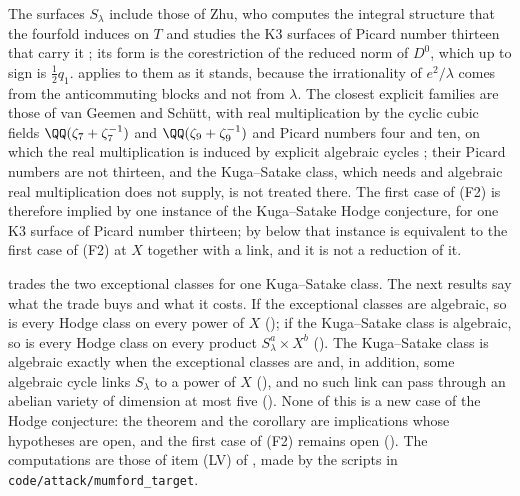 \begin{remark}
The surfaces $S_{\lambda}$ include those of Zhu, who computes the integral
structure that the fourfold induces on $T$ and studies the K3 surfaces of
Picard number thirteen that carry it \cite{Zhu18}; its form is the
corestriction of the reduced norm of $D^{0}$, which up to sign is
$\frac12q_{1}$.
 applies to them as it stands, because the irrationality
of $e^{2}/\lambda$ comes from the anticommuting blocks and not from $\lambda$.
The closest explicit families are those of van Geemen and Sch\"utt, with
real multiplication by the cyclic cubic fields $\QQ(\zeta_{7}+\zeta_{7}^{-1})$
and $\QQ(\zeta_{9}+\zeta_{9}^{-1})$ and Picard numbers four and ten, on which
the real multiplication is induced by explicit algebraic cycles
\cite[Theorem~1.2 and Section~4.8]{vGS25}; their Picard numbers are not
thirteen, and the Kuga--Satake class, which  needs and
algebraic real multiplication does not supply, is not treated there.
The first case of (F2) is therefore implied by one instance of the
Kuga--Satake Hodge conjecture, for one K3 surface of Picard number thirteen;
by  below that instance is equivalent to the first
case of (F2) at $X$ together with a link, and it is not a reduction of it.
\end{remark}

 trades the two exceptional classes for one Kuga--Satake
class. The next results say what the trade buys and what it costs. If the
exceptional classes are algebraic, so is every Hodge class on every power of
$X$ (); if the Kuga--Satake class is algebraic, so is
every Hodge class on every product $S_{\lambda}^{a}\times X^{b}$
(). The Kuga--Satake class is algebraic exactly
when the exceptional classes are and, in addition, some algebraic cycle links
$S_{\lambda}$ to a power of $X$ (), and no such link
can pass through an abelian variety of dimension at most five
(). None of this is a new case of the Hodge
conjecture: the theorem and the corollary are implications whose hypotheses
are open, and the first case of (F2) remains open
(). The computations are those of item (LV) of
, made by the scripts in
\texttt{code/\allowbreak attack/\allowbreak mumford\_\allowbreak target}.

